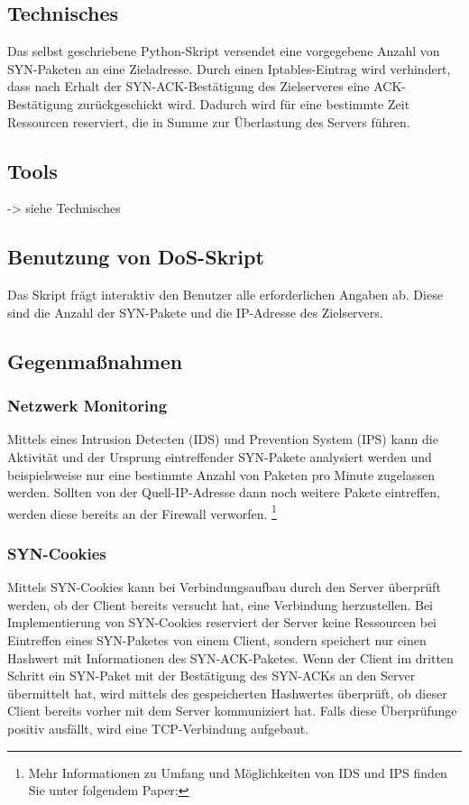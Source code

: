 \subsection*{Technisches}
Das selbst geschriebene Python-Skript versendet eine vorgegebene Anzahl von SYN-Paketen an eine Zieladresse. Durch einen Iptables-Eintrag wird verhindert, dass nach Erhalt der SYN-ACK-Bestätigung
des Zielserveres eine ACK-Bestätigung zurückgeschickt wird. Dadurch wird für eine bestimmte Zeit Ressourcen reserviert, die in Summe zur Überlastung des Servers führen.

\subsection*{Tools}
-> siehe Technisches

\subsection*{Benutzung von DoS-Skript}
Das Skript frägt interaktiv den Benutzer alle erforderlichen Angaben ab. Diese sind die Anzahl der SYN-Pakete und die IP-Adresse des Zielservers.

\subsection*{Gegenmaßnahmen}

\subsubsection*{Netzwerk Monitoring}
Mittels eines Intrusion Detecten (IDS) und Prevention System (IPS) kann die Aktivität und der Ursprung eintreffender SYN-Pakete analysiert werden und beispielsweise nur eine bestimmte Anzahl von Paketen pro
Minute zugelassen werden. Sollten von der Quell-IP-Adresse dann noch weitere Pakete eintreffen, werden diese bereits an der Firewall verworfen. \footnote{Mehr Informationen zu Umfang und Möglichkeiten von IDS und IPS finden Sie unter folgendem Paper:\cite{differenceipsids}} 

\subsubsection*{SYN-Cookies}
Mittels SYN-Cookies kann bei Verbindungsaufbau durch den Server überprüft werden, ob der Client bereits versucht hat, eine Verbindung herzustellen. Bei Implementierung von SYN-Cookies reserviert der Server keine Ressourcen bei Eintreffen eines SYN-Paketes von einem Client, sondern speichert nur einen Hashwert mit Informationen des SYN-ACK-Paketes. Wenn der Client im dritten Schritt ein SYN-Paket mit der Bestätigung des SYN-ACKs an den Server übermittelt hat, wird mittels des gespeicherten Hashwertes überprüft, ob dieser Client bereits vorher mit dem Server kommuniziert hat. Falls diese Überprüfunge positiv ausfällt, wird eine TCP-Verbindung aufgebaut.\newpage


